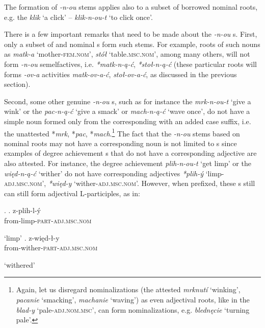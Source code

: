 The formation of   \textit{-n-ou} stems applies also to a subset of borrowed nominal roots, e.g. the   \textit{klik} `a click' -- \textit{klik-n-ou-t} `to click once'.
\par
There is a few important remarks that need to be made about the \textit{-n-ou} s. First, only a subset of  and  nominal s form such stems. For example, roots of such  nouns as \textit{matk-a} `mother-\textsc{fem.nom}', \textit{st\'o\l} `table.\textsc{msc.nom}', among many others, will not form \textit{-n-ou}  semelfactives, i.e. \textit{*matk-n-\k{a}-\'c}, \textit{*sto\l-n-\k{a}-\'c} (these particular roots will forms \textit{-ov-a} activities \textit{matk-ov-a-\'c}, \textit{sto\l-ov-a-\'c}, as discussed in the previous section).
\par
 Second, some other genuine \textit{-n-ou} s, such as for instance the  \textit{mrk-n-ou-t} `give a wink' or the  \textit{pac-n-\k{a}-\'c} `give a smack' or \textit{mach-n-\k{a}-\'c} `wave once', do not have a simple noun formed only from the corresponding  with an added case suffix, i.e. the unattested *\textit{mrk}, *\textit{pac}, *\textit{mach}.\footnote{Again, let us disregard nominalizations (the attested \textit{mrknut\'i} `winking', \textit{pacanie} `smacking', \textit{machanie} `waving') as even adjectival roots, like in the  \textit{blad-y} `pale-\textsc{adj.nom.msc}', can form nominalizations, e.g. \textit{bledn\k{e}cie} `turning pale'.
 } %
The fact that the \textit{-n-ou} stems based on nominal roots may not have a corresponding noun is not limited to s since examples of  degree achievement s that do not have a corresponding adjective are also attested. For instance, the  degree achievement  \textit{plih-n-ou-t} `get limp' or the  \textit{wi\k{e}d-n-\k{a}-\'c} `wither' do not have corresponding adjectives \textit{*plih-\'y} `limp-\textsc{adj.msc.nom}', \textit{*wi\k{e}d-y} `wither-\textsc{adj.msc.nom}'. However, when prefixed, these s still can still form adjectival L-participles, as in:

\ex.
\ag.  
z-plih-l-\'y\\
from-limp-\textsc{part}-\textsc{adj.msc.nom}\\
\strut `limp'
\bg.
z-wi\k{e}d-\l-y\\
from-wither-\textsc{part}-\textsc{adj.msc.nom}\\
\strut `withered'

